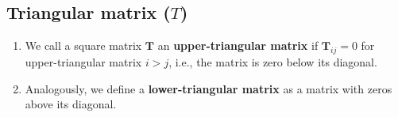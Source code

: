 \subsection{Triangular matrix ($T$)}

\begin{enumerate}
    \item We call a square matrix $\bm{T}$ an \textbf{upper-triangular matrix} if $\bm{T}_{ij} = 0$ for upper-triangular matrix $i > j$, i.e., the matrix is zero below its diagonal. 
    \hfill \cite{mfml/book/mml/Deisenroth-Faisal-Ong}

    \item Analogously, we define a \textbf{lower-triangular matrix} as a matrix with zeros above its diagonal. 
    \hfill \cite{mfml/book/mml/Deisenroth-Faisal-Ong}
\end{enumerate}





